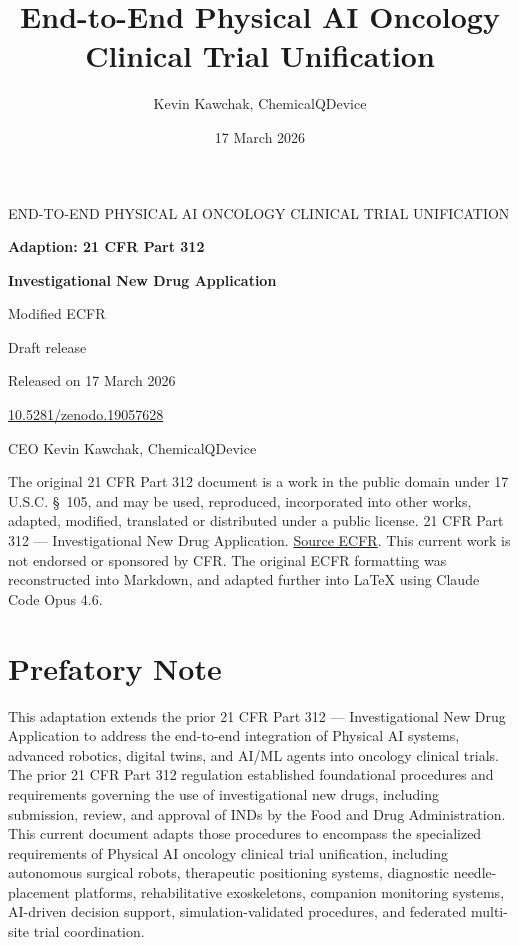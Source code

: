 \documentclass[11pt]{article}
\title{End-to-End Physical AI Oncology Clinical Trial Unification}
\author{Kevin Kawchak, ChemicalQDevice}
\date{17 March 2026}
\begin{document}
\begin{titlepage}
\centering
{\Large END-TO-END PHYSICAL AI ONCOLOGY CLINICAL TRIAL UNIFICATION\par}
\vspace{1.5cm}
{\Huge\bfseries Adaption: 21 CFR Part 312\par}
\vspace{0.5cm}
{\LARGE\bfseries Investigational New Drug Application\par}
\vspace{0.3cm}
{\Large Modified ECFR\par}
\vspace{0.8cm}
{\large Draft release\par}
\vspace{0.2cm}
{\large Released on 17 March 2026\par}
\vspace{0.2cm}
{\large \href{https://doi.org/10.5281/zenodo.19057628}{10.5281/zenodo.19057628}\par}
\vspace{0.2cm}
{\large CEO Kevin Kawchak, ChemicalQDevice\par}
\vfill
{\small The original 21 CFR Part 312 document is a work in the public domain under 17 U.S.C. \S~105, and may be used, reproduced, incorporated into other works, adapted, modified, translated or distributed under a public license. 21 CFR Part 312 --- Investigational New Drug Application. \href{https://www.ecfr.gov/current/title-21/chapter-I/subchapter-D/part-312}{Source ECFR}. This current work is not endorsed or sponsored by CFR. The original ECFR formatting was reconstructed into Markdown, and adapted further into LaTeX using Claude Code Opus 4.6.\par}
\end{titlepage}

\tableofcontents
\clearpage
\section*{Prefatory Note}

This adaptation extends the prior 21 CFR Part 312 --- Investigational New Drug Application to address the end-to-end integration of Physical AI systems, advanced robotics, digital twins, and AI/ML agents into oncology clinical trials. The prior 21 CFR Part 312 regulation established foundational procedures and requirements governing the use of investigational new drugs, including submission, review, and approval of INDs by the Food and Drug Administration. This current document adapts those procedures to encompass the specialized requirements of Physical AI oncology clinical trial unification, including autonomous surgical robots, therapeutic positioning systems, diagnostic needle-placement platforms, rehabilitative exoskeletons, companion monitoring systems, AI-driven decision support, simulation-validated procedures, and federated multi-site trial coordination.
\end{document}
